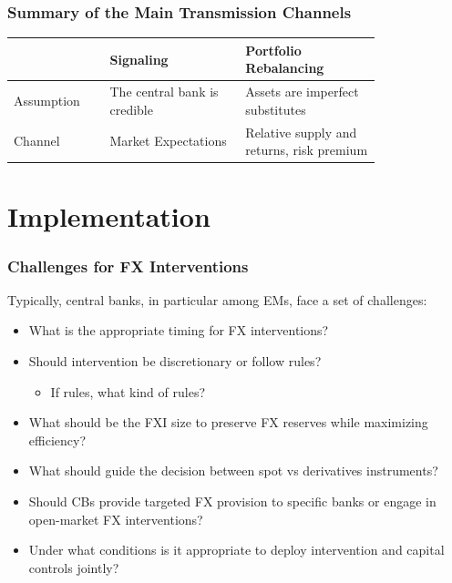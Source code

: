 \documentclass{beamer}
\begin{document}
\begin{frame}
  \frametitle{Summary of the Main Transmission Channels}

\begin{tabular}{p{0.2\linewidth}|p{0.3\linewidth}| p{0.3\linewidth}}
\hline
     &  Signaling  &  Portfolio Rebalancing \\ 
\hline
    Assumption &  The central bank is credible &  Assets are imperfect substitutes \\ 
\hline
    Channel & Market Expectations & Relative supply and returns, risk premium \\ 
\hline
\end{tabular}
\end{frame}




\section{Implementation}

\begin{frame}
  \frametitle{Challenges for FX Interventions}

  Typically, central banks, in particular among EMs, face a set of challenges:
  \begin{itemize}
  \item What is the appropriate timing for FX interventions?
  \item Should intervention be discretionary or follow rules?
      \begin{itemize}
      \item If rules, what kind of rules?
      \end{itemize}    
    \item What should be the FXI size to preserve FX reserves while maximizing efficiency?
  \item What should guide the decision between spot vs derivatives instruments?
  \item Should CBs provide targeted FX provision to specific banks or engage in open-market FX interventions?
  \item Under what conditions is it appropriate to deploy intervention and capital controls jointly?
  \end{itemize}
\end{frame}
\end{document}
